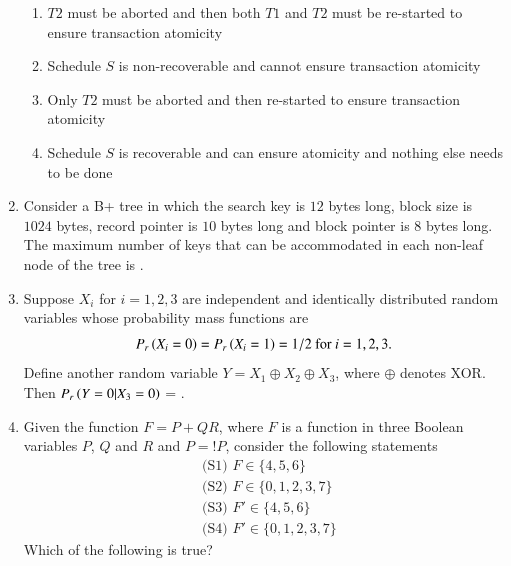 \documentclass[journal,12pt,onecolumn]{IEEEtran}
\theoremstyle{remark}
\begin{document}
\begin{enumerate}
				\hfill{}
				
				\begin{enumerate}
					\item $T2$ must be aborted and then both $T1$ and $T2$ must be re-started to ensure transaction atomicity
					\item Schedule $S$ is non-recoverable and cannot ensure transaction atomicity
					\item Only $T2$ must be aborted and then re-started to ensure transaction atomicity
					\item Schedule $S$ is recoverable and can ensure atomicity and nothing else needs to be done
				\end{enumerate}
				
				\item Consider a B+ tree in which the search key is $12$ bytes long, block size is $1024$ bytes, record pointer is $10$ bytes long and block pointer is $8$ bytes long. The maximum number of keys that can be accommodated in each non-leaf node of the tree is \underline{\hspace{2cm}}.
				
				\hfill{}
				
				\item Suppose $X_i$ for $i=1,2,3$ are independent and identically distributed random variables whose probability mass functions are
				$$P_r\left(X_i = 0\right) = P_r\left(X_i = 1\right) = 1/2 \text{ for } i = 1,2,3.$$
				Define another random variable $Y = X_1 \oplus X_2 \oplus X_3$, where $\oplus$ denotes XOR. Then $P_r\left(Y = 0 | X_3 = 0\right)$ = \underline{\hspace{2cm}}.
				
				\hfill{}
				
				\item Given the function $F = P + QR$, where $F$ is a function in three Boolean variables $P$, $Q$ and $R$ and $P = !P$, consider the following statements
				\begin{align*}
					&\text{(S1) } F \in \{4,5,6\}\\
					&\text{(S2) } F \in \{0,1,2,3,7\}\\
					&\text{(S3) } F' \in \{4,5,6\}\\
					&\text{(S4) } F' \in \{0,1,2,3,7\}
				\end{align*}
				Which of the following is true?
				
				\hfill{}
				

\end{enumerate}
\end{document}
